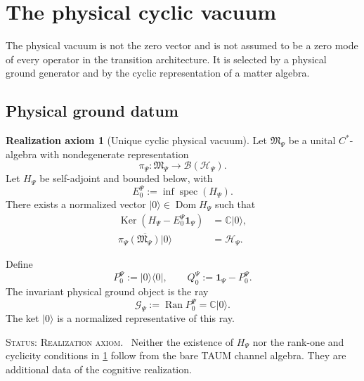 \documentclass[11pt,reqno]{scrartcl}
\newcommand{\CC}{\mathbb C}
\newcommand{\scrHP}{\mathscr H_{\Psi}}
\newcommand{\algP}{\mathfrak M_{\Psi}}
\newcommand{\piP}{\pi_{\Psi}}
\newcommand{\PzeroP}{P_{0}^{\Psi}}
\newcommand{\QzeroP}{Q_{0}^{\Psi}}
\newcommand{\idop}{\mathbf 1}
\newcommand{\ket}[1]{\lvert #1\rangle}
\newcommand{\bra}[1]{\langle #1\rvert}
\DeclareMathOperator{\Dom}{Dom}
\DeclareMathOperator{\Ran}{Ran}
\DeclareMathOperator{\Ker}{Ker}
\DeclareMathOperator{\spec}{spec}
\newcommand{\statuslabel}[1]{\par\smallskip\noindent\textsc{Status: #1.}\ }
\theoremstyle{plain}
\theoremstyle{definition}
\newtheorem{axiom}[axiom]{Realization axiom}
\theoremstyle{remark}
\begin{document}
\section{The physical cyclic vacuum}
\label{sec:physical-cyclic-vacuum}

The physical vacuum is not the zero vector and is not assumed to be a zero
mode of every operator in the transition architecture.  It is selected by a
physical ground generator and by the cyclic representation of a matter
algebra.

\subsection{Physical ground datum}

\begin{axiom}[Unique cyclic physical vacuum]
\label{ax:physical-vacuum}
Let $\algP$ be a unital $C^*$-algebra with nondegenerate representation
\begin{equation}
  \piP:\algP\longrightarrow\mathcal B(\scrHP).
\end{equation}
Let $H_{\Psi}$ be self-adjoint and bounded below, with
\begin{equation}
  E_0^{\Psi}:=\inf\spec(H_{\Psi}).
\end{equation}
There exists a normalized vector $\ket0\in\Dom H_{\Psi}$ such that
\begin{align}
  \Ker(H_{\Psi}-E_0^{\Psi}\idop_{\Psi})
  &=\CC\ket0,
  \label{eq:physical-unique-ground}\\
  \overline{\piP(\algP)\ket0}
  &=\scrHP.
  \label{eq:physical-cyclic-vacuum}
\end{align}
\end{axiom}

Define
\begin{equation}
  \PzeroP:=\ket0\!\bra0,
  \qquad
  \QzeroP:=\idop_{\Psi}-\PzeroP.
  \label{eq:physical-ground-projections}
\end{equation}
The invariant physical ground object is the ray
\begin{equation}
  \mathscr G_{\Psi}:=\Ran\PzeroP=\CC\ket0.
\end{equation}
The ket $\ket0$ is a normalized representative of this ray.

\statuslabel{Realization axiom} Neither the existence of $H_{\Psi}$ nor the
rank-one and cyclicity conditions in \cref{ax:physical-vacuum} follow from the
bare TAUM channel algebra.  They are additional data of the cognitive
realization.
\end{document}
